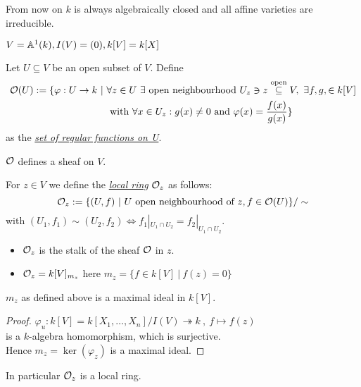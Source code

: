 From now on $k$ is always algebraically closed and all affine varieties are irreducible.

\begin{Bsp}
$V=\mathbb{A}^1(k), I(V)=(0), k[V]=k[X]$
\end{Bsp}

\begin{defi}
Let $U\subseteq V$ be an open subset of $V$. Define
\begin{align*}
\O(U):=\{\varphi: U \to k \ | \ &\forall z \in U \  \exists \text{ open neighbourhood } U_z \ni z \stackrel{\text{open}}{\subseteq} V,\ \exists f,g, \in k[V]\\
& \text{ with } \forall x \in U_z: g(x) \neq 0 \text{ and } \varphi(x)=\frac{f(x)}{g(x)}\}
\end{align*}
as the \emph{\underline{set of regular functions on U}}.
\end{defi}

\begin{Bem*}
$\mathcal{O}$ defines a sheaf on $V$.
\end{Bem*}

\begin{defi}
For $z \in V$ we define the \emph{\underline{local ring}} $\mathcal{O}_z$ as follows:
\[\mathcal{O}_z:=\{(U,f) \ | \ U \text{ open neighbourhood of } z, f \in \mathcal{O}(U)\}/\sim\]
with $(U_1,f_1) \sim (U_2, f_2) \iff f_1|_{U_1 \cap U_2} = f_2|_{U_1 \cap U_2}$.
\end{defi}


\begin{Bem*}
\begin{itemize}
\item $\mathcal{O}_z$ is the stalk of the sheaf $\mathcal{O}$ in $z$.
\item $\mathcal{O}_z = k[V]_{m_z}$ here $m_z=\{f \in k[V] \ | \ f(z)=0\}$
\end{itemize}
\end{Bem*}

\begin{Bem}
$m_z$ as defined above is a maximal ideal in $k[V]$.
\end{Bem}

\begin{proof}
$\varphi_u: k[V] = k[X_1, \dots, X_n] / I(V) \twoheadrightarrow k \ , \  f\mapsto f(z)$\\
is a $k$-algebra homomorphism, which is surjective.\\
Hence $m_z=\ker(\varphi_z)$ is a maximal ideal.
\end{proof}

\begin{Bem}
In particular $\mathcal{O}_z$ is a local ring.
\end{Bem}

